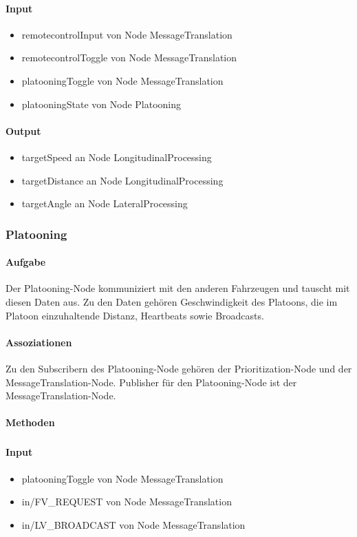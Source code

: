 \documentclass[a4paper, 12pt, titlepage]{scrartcl}
\begin{document}
				\paragraph{Input}
				    \begin{itemize}
				        \item remotecontrolInput von Node MessageTranslation
				        \item remotecontrolToggle von Node MessageTranslation 
				        \item platooningToggle von Node MessageTranslation 
				        \item platooningState von Node Platooning
				    \end{itemize}
				\paragraph{Output}
				    \begin{itemize}
				        \item targetSpeed an Node LongitudinalProcessing
				        \item targetDistance an Node LongitudinalProcessing
				        \item targetAngle an Node LateralProcessing
				    \end{itemize}
				
			\subsubsection{Platooning}
			\label{platooning}
				\paragraph{Aufgabe} Der Platooning-Node kommuniziert mit den anderen Fahrzeugen und tauscht mit diesen Daten aus. Zu den Daten gehören Geschwindigkeit des Platoons, die im Platoon einzuhaltende Distanz, Heartbeats sowie Broadcasts. 
				\paragraph{Assoziationen} Zu den Subscribern des Platooning-Node gehören der Prioritization-Node und der MessageTranslation-Node. Publisher für den Platooning-Node ist der MessageTranslation-Node. 
				\paragraph{Methoden}
					\subparagraph{} 
				\paragraph{Input} 
				    \begin{itemize}
    					\item platooningToggle von Node MessageTranslation
    					\item in/FV\_REQUEST von Node MessageTranslation
    					\item in/LV\_BROADCAST von Node MessageTranslation
    				\end{itemize}
\end{document}
